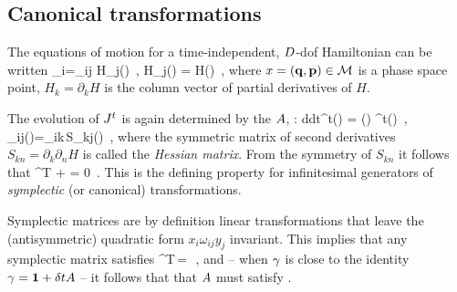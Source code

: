 \subsection{Canonical transformations}
\label{sect:CanonTransf}

The equations of motion
for a time-independent, $D$-dof Hamiltonian
can be written
\beq
{}_i={\omega}_{ij} H_j(\pSpace)
    \,, \quad
    H_j(\pSpace) =
     H(\pSpace)
        \,,
where $\pSpace = ({\bf q},{\bf p}) \in \pS$ is a phase space point,
$H_{k} = \partial_k H$
is the column vector of partial derivatives of $H$.

The
evolution of $\jMps^t$  is again determined by
the {\stabmat} $\Mvar$, :
\beq
{d\over dt}\jMps^t(\pSpace) = \Mvar(\pSpace)
\jMps^t(\pSpace)
\,, \qquad
\Mvar_{ij}(\pSpace)={\omega}_{ik}\,S_{kj}(\pSpace)
\,,
where the symmetric matrix of second derivatives
$S_{kn} = \partial_k \partial_n H$
is called the {\em Hessian matrix}.
From
the symmetry of $S_{kn}$
it follows that
\beq
 \Mvar^T {\bf \omega} + {\bf \omega} \Mvar = 0
\,.
This is the defining property  for infinitesimal
generators of {\em symplectic} (or canonical) transformations.

Symplectic matrices are by definition linear transformations that leave
the (antisymmetric) quadratic form $x_i \omega_{ij} y_j$ invariant. This
implies that any symplectic matrix satisfies
\beq
\LieEl^T\omega \LieEl \,=\, \omega
\,,
\label{sympQ}
\eeq
and -- when $\gamma$ is close to the identity $\gamma={\bf 1} + \delta t
A$ -- it follows that that $A$ must satisfy .

